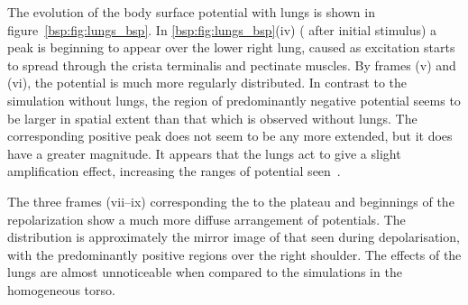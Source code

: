 The evolution of the body surface potential with lungs is shown in
figure~\ref{bsp:fig:lungs_bsp}.
In \ref{bsp:fig:lungs_bsp}(iv) ( after initial stimulus) a peak is
beginning to appear over the lower right lung, caused as excitation starts to
spread through the crista terminalis and pectinate muscles.
By frames (v) and (vi), the potential is much more regularly distributed.
In contrast to the simulation without lungs, the region of predominantly
negative potential seems to be larger in spatial extent than that which is
observed without lungs.
The corresponding positive peak does not seem to be any more extended, but it
does have a greater magnitude.
It appears that the lungs act to give a slight amplification
effect, increasing the ranges of potential seen~\cite{Gulrajani1983}.

The three frames (vii--ix) corresponding the to the plateau and beginnings of the
repolarization show a much more diffuse arrangement of potentials.
The distribution is approximately the mirror image of that seen during
depolarisation, with the predominantly positive regions over the right shoulder.
The effects of the lungs are almost unnoticeable when compared to the
simulations in the homogeneous torso.

